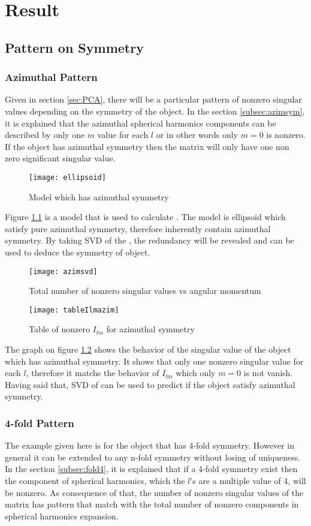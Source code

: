 \chapter{Result}
\section{Pattern on Symmetry}\label{sec:pattsymm}
\subsection{Azimuthal Pattern}
Given in section \ref{sec:PCA}, there will be a particular pattern of nonzero singular values depending on the symmetry of the object. In the section \ref{subsec:azimsym}, it is explained that the azimuthal spherical harmonics components can be described by only one $m$ value for each $l$ or in other words only $m=0$ is nonzero. If the object has azimuthal symmetry then the matrix \Blq will only have one non zero significant singular value. 
\begin{figure}[ht]
  \centering
  \texttt{[image: ellipsoid]}
\caption{Model which has azimuthal symmetry}
\label{fig:ellipsoid}
\end{figure}

Figure \ref{fig:ellipsoid} is a model that is used to calculate \Blq. The model is ellipsoid which satisfy pure azimuthal symmetry, therefore \Blq inherently contain azimuthal symmetry. By taking SVD of the \Blq, the redundancy will be revealed and can be used to deduce the symmetry of object.
 \begin{figure}[ht]
  \centering
  \texttt{[image: azimsvd]}
\caption{Total number of nonzero singular values vs angular momentum}
\label{fig:azimsvd}
\end{figure}
\begin{figure}[ht]
  \centering
  \texttt{[image: tableIlmazim]}
\caption{Table of nonzero $I_{lm}$ for azimuthal symmetry}
\label{fig:azimtable}
\end{figure}

The graph on figure \ref{fig:azimsvd} shows the behavior of the singular value of the object which has azimuthal symmetry. It shows that only one nonzero singular value for each $l$, therefore it matchs the behavior of $I_{lm}$ which only $m=0$ is not vanish. Having said that, SVD of \Blq can be used to predict if the object satisfy azimuthal symmetry. 

\subsection{4-fold Pattern}
The example given here is for the object that has 4-fold symmetry. However in general it can be extended to any n-fold symmetry without losing of uniqueness. In the section \ref{subsec:fold4}, it is explained that if a 4-fold symmetry exist then the component of spherical harmonics, which the $l$'s are a multiple value of 4, will be nonzero. As consequence of that, the number of nonzero singular values of the matrix \Blq has pattern that match with the total number of nonzero components in spherical harmonics expansion.  

